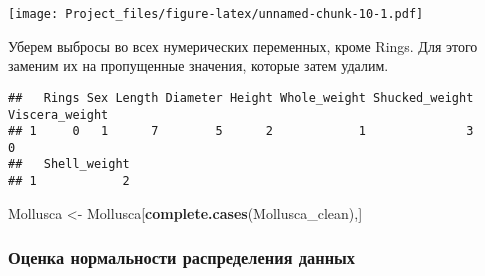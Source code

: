 \documentclass[]{article}
\newenvironment{Shaded}{\begin{snugshade}}{\end{snugshade}}
\newcommand{\DecValTok}[1]{\textcolor[rgb]{0.00,0.00,0.81}{#1}}
\newcommand{\KeywordTok}[1]{\textcolor[rgb]{0.13,0.29,0.53}{\textbf{#1}}}
\newcommand{\NormalTok}[1]{#1}
\newcommand{\OperatorTok}[1]{\textcolor[rgb]{0.81,0.36,0.00}{\textbf{#1}}}
\newcommand{\OtherTok}[1]{\textcolor[rgb]{0.56,0.35,0.01}{#1}}
\newcommand{\StringTok}[1]{\textcolor[rgb]{0.31,0.60,0.02}{#1}}
\begin{document}
\texttt{[image: Project\_files/figure-latex/unnamed-chunk-10-1.pdf]}

Уберем выбросы во всех нумерических переменных, кроме Rings. Для этого
заменим их на пропущенные значения, которые затем удалим.

\begin{Shaded}
\end{Shaded}

\begin{verbatim}
##   Rings Sex Length Diameter Height Whole_weight Shucked_weight Viscera_weight
## 1     0   1      7        5      2            1              3              0
##   Shell_weight
## 1            2
\end{verbatim}

\begin{Shaded}
\begin{Highlighting}[]
\NormalTok{Mollusca <-}\StringTok{ }\NormalTok{Mollusca[}\KeywordTok{complete.cases}\NormalTok{(Mollusca_clean),]}
\end{Highlighting}
\end{Shaded}

\hypertarget{ux43eux446ux435ux43dux43aux430-ux43dux43eux440ux43cux430ux43bux44cux43dux43eux441ux442ux438-ux440ux430ux441ux43fux440ux435ux434ux435ux43bux435ux43dux438ux44f-ux434ux430ux43dux43dux44bux445}{%
\subsubsection{Оценка нормальности распределения
данных}\label{ux43eux446ux435ux43dux43aux430-ux43dux43eux440ux43cux430ux43bux44cux43dux43eux441ux442ux438-ux440ux430ux441ux43fux440ux435ux434ux435ux43bux435ux43dux438ux44f-ux434ux430ux43dux43dux44bux445}}
\end{document}
